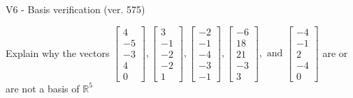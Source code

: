 \begin{exercise}
  \begin{exerciseTitle}V6 - Basis verification (ver. 575)\end{exerciseTitle}
  \begin{exerciseStatement}
    Explain why the vectors \(\left[\begin{array}{r}
4 \\
-5 \\
-3 \\
4 \\
0
\end{array}\right] , \left[\begin{array}{r}
3 \\
-1 \\
-2 \\
-2 \\
1
\end{array}\right] , \left[\begin{array}{r}
-2 \\
-1 \\
-4 \\
-3 \\
-1
\end{array}\right] , \left[\begin{array}{r}
-6 \\
18 \\
21 \\
-3 \\
3
\end{array}\right] , \text{ and } \left[\begin{array}{r}
-4 \\
-1 \\
2 \\
-4 \\
0
\end{array}\right]\) are or are not a basis of \(\mathbb{R}^5\)	



\end{exerciseStatement}
\end{exercise}

